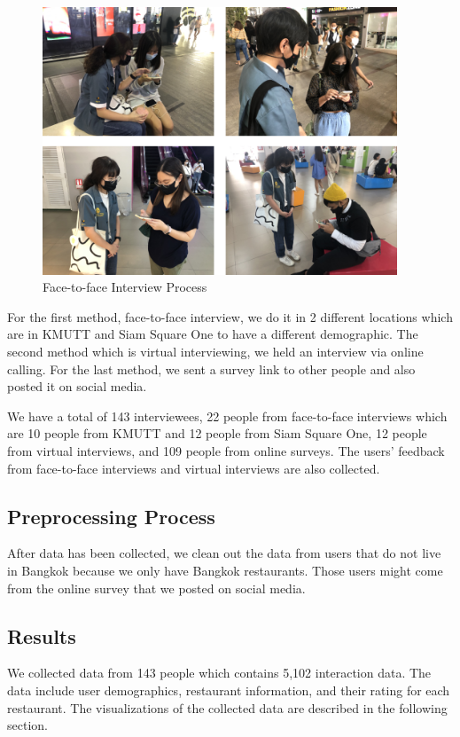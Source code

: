 \documentclass[12pt,oneside,openright,a4paper]{cpe-english-project}
\begin{document}
\newpage
\begin{figure}[H]\centering
\includegraphics[width=300pt]{./images/4FacetofaceInterviewProcess.png}
\caption{Face-to-face Interview Process}\label{fig:4FacetofaceInterviewProcess}
\end{figure}

For the first method, face-to-face interview, we do it in 2 different locations which are in KMUTT and Siam Square One to have a different demographic. The second method which is virtual interviewing, we held an interview via online calling. For the last method, we sent a survey link to other people and also posted it on social media.

We have a total of 143 interviewees, 22 people from face-to-face interviews which are 10 people from KMUTT and 12 people from Siam Square One, 12 people from virtual interviews, and 109 people from online surveys. The users' feedback from face-to-face interviews and virtual interviews are also collected.

\subsection{Preprocessing Process}

After data has been collected, we clean out the data from users that do not live in Bangkok because we only have Bangkok restaurants. Those users might come from the online survey that we posted on social media.

\subsection{Results}


We collected data from 143 people which contains 5,102 interaction data. The data include user demographics, restaurant information, and their rating for each restaurant. The visualizations of the collected data are described in the following section.
\end{document}
